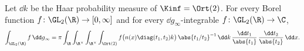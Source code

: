 Let $\dd k$ be the Haar probability measure of $\Kinf=\Ort(2)$. For every Borel function
$f\colon\GL_2(\R)\to[0,\infty]$ and for every $\dd g_\infty$-integrable $f\colon\GL_2(\R)\to\C$,
\[
  \int_{\GL_2(\R)}f\,\dd g_\infty=\pi\int_\R\int_{\R^\times}\int_{\R^\times}\int_{\Ort(2)}
  f\bigl(n(x)\diag(t_1,t_2)k\bigr)\,\abs{t_1/t_2}^{-1}\,\dd k\,\frac{\dd t_1}{\abs{t_1}}\,\frac{\dd t_2}{\abs{t_2}}\,\dd x .
\]
